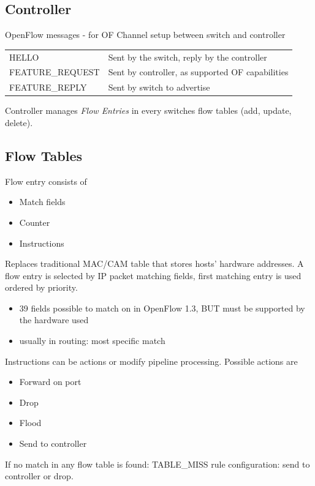 \documentclass[11pt, a4paper]{article}
\begin{document}
\subsection{Controller}
OpenFlow messages - for OF Channel setup between switch and controller
\begin{table}[]
	\begin{tabular}{l|l}
	HELLO & Sent by the switch, reply by the controller \\
		FEATURE\_REQUEST & Sent by controller, as supported OF capabilities \\
		FEATURE\_REPLY & Sent by switch to advertise \\
	\end{tabular}
\end{table}
Controller manages \emph{Flow Entries} in every switches flow tables (add, update, delete).

\subsection{Flow Tables}
Flow entry consists of
\begin{itemize}
	\item Match fields
	\item Counter
	\item Instructions
\end{itemize}

Replaces traditional MAC/CAM table that stores hosts' hardware addresses. A flow entry is selected by IP packet matching fields, first matching entry is used ordered by priority.
\begin{itemize}
	\item 39 fields possible to match on in OpenFlow 1.3, BUT must be supported by the hardware used
	\item usually in routing: most specific match
\end{itemize}

Instructions can be actions or modify pipeline processing. Possible actions are
\begin{itemize}
	\item Forward on port
	\item Drop
	\item Flood
	\item Send to controller
\end{itemize}

If no match in any flow table is found: TABLE\_MISS rule configuration: send to controller or drop.
\end{document}
